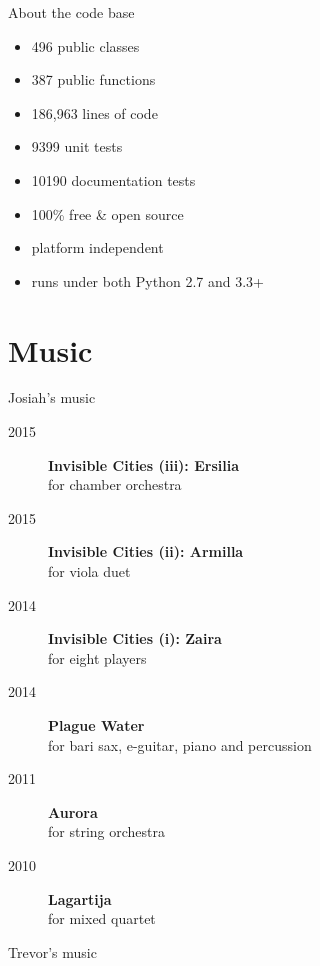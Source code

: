 \documentclass[10pt]{beamer}
\begin{document}
\begin{frame}{About the code base}

    \begin{itemize}
        \item 496 public classes
        \item 387 public functions
        \item 186,963 lines of code
        \item 9399 unit tests
        \item 10190 documentation tests
        \item 100\% free \& open source
        \item platform independent
        \item runs under both Python 2.7 and 3.3+
    \end{itemize}

\end{frame}

\section{Music}

\begin{frame}{Josiah's music}
    \begin{description}
        \item[2015] \textbf{Invisible Cities (iii): Ersilia} \\
            for chamber orchestra
        \item[2015] \textbf{Invisible Cities (ii): Armilla} \\
            for viola duet
        \item[2014] \textbf{Invisible Cities (i): Zaira} \\
            for eight players
        \item[2014] \textbf{Plague Water} \\
            for bari sax, e-guitar, piano and percussion
        \item[2011] \textbf{Aurora} \\
            for string orchestra
        \item[2010] \textbf{Lagartija} \\
            for mixed quartet
    \end{description}
\end{frame}

\begin{frame}{Trevor's music}
\end{frame}
\end{document}
